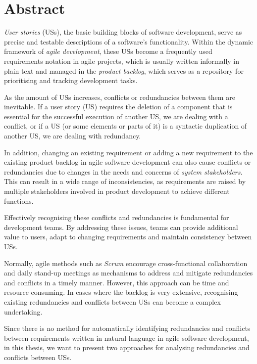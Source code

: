 \newpage
\section*{ Abstract}
\emph{User stories} (USs), the basic building blocks of software development, serve as precise and testable descriptions of a software's functionality. Within the dynamic framework of \emph{agile development}, these USs become a frequently used requirements notation in agile projects\cite{wang2014role}, which is usually written informally in plain text and managed in the \textit{product backlog}, which serves as a repository for prioritising and tracking development tasks.

As the amount of USs increases, conflicts or redundancies between them are inevitable. If a user story (US) requires the deletion of a component that is essential for the successful execution of another US, we are dealing with a conflict, or if a US (or some elements or parts of it) is a syntactic duplication of another US, we are dealing with redundancy.

In addition, changing an existing requirement or adding a new requirement to the existing product backlog in agile software development can also cause conflicts or redundancies due to changes in the needs and concerns of \emph{system stakeholders}. This can result in a wide range of inconsistencies, as requirements are raised by multiple stakeholders involved in product development to achieve different functions.

Effectively recognising these conflicts and redundancies is fundamental for development teams. By addressing these issues, teams can provide additional value to users, adapt to changing requirements and maintain consistency between USs. 

Normally, agile methods such as \emph{Scrum} encourage cross-functional collaboration and daily stand-up meetings as mechanisms to address and mitigate redundancies and conflicts in a timely manner. However, this approach can be time and resource consuming. In cases where the backlog is very extensive, recognising existing redundancies and conflicts between USs can become a complex undertaking.

Since there is no method for automatically identifying redundancies and conflicts between requirements written in natural language in agile software development, in this thesis, we want to present two approaches for analysing redundancies and conflicts between USs.

